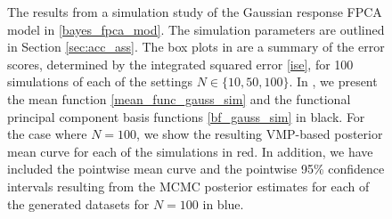 \documentclass[12pt]{article}
\theoremstyle{plain}
\theoremstyle{definition}
\theoremstyle{remark}
\begin{document}
\begin{figure}[t!]
\centering
\tabskip=0pt
\caption{
	The results from a simulation study of the Gaussian response FPCA model in \eqref{bayes_fpca_mod}. The
	simulation parameters are outlined in Section \ref{sec:acc_ass}.
	The box plots in  are a summary of the error scores, determined by the integrated
	squared error \eqref{ise}, for 100 simulations of each of the settings $N \in \{ 10, 50, 100 \}$.
	In , we present the mean function \eqref{mean_func_gauss_sim} and the functional
	principal component basis functions \eqref{bf_gauss_sim} in black. For the case where $N = 100$, we show
	the resulting VMP-based posterior mean curve for each of the simulations in red. In addition, we have
	included the pointwise mean curve and the pointwise 95\% confidence intervals resulting from the MCMC
	posterior estimates for each of the generated datasets
	for $N = 100$ in blue.
}
\label{fig:gauss_resp_sim_st}
\end{figure}
\end{document}
